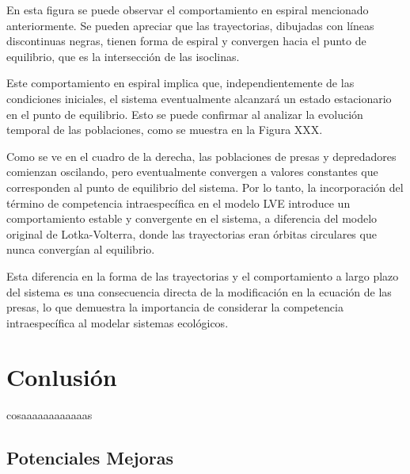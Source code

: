 \documentclass{article}
\begin{document}
\noindent En esta figura se puede observar el comportamiento en espiral mencionado anteriormente. Se pueden apreciar que las trayectorias, dibujadas con líneas discontinuas negras, tienen forma de espiral y convergen hacia el punto de equilibrio, que es la intersección de las isoclinas.
\vspace{1\baselineskip}

\noindent Este comportamiento en espiral implica que, independientemente de las condiciones iniciales, el sistema eventualmente alcanzará un estado estacionario en el punto de equilibrio. Esto se puede confirmar al analizar la evolución temporal de las poblaciones, como se muestra en la Figura XXX.
\vspace{1\baselineskip}

\noindent Como se ve en el cuadro de la derecha, las poblaciones de presas y depredadores comienzan oscilando, pero eventualmente convergen a valores constantes que corresponden al punto de equilibrio del sistema. Por lo tanto, la incorporación del término de competencia intraespecífica en el modelo LVE introduce un comportamiento estable y convergente en el sistema, a diferencia del modelo original de Lotka-Volterra, donde las trayectorias eran órbitas circulares que nunca convergían al equilibrio.
\vspace{1\baselineskip}

\noindent Esta diferencia en la forma de las trayectorias y el comportamiento a largo plazo del sistema es una consecuencia directa de la modificación en la ecuación de las presas, lo que demuestra la importancia de considerar la competencia intraespecífica al modelar sistemas ecológicos.
\vspace{1\baselineskip}













\section*{Conlusión}
\noindent cosaaaaaaaaaaaas



\subsection*{Potenciales Mejoras}
\end{document}
